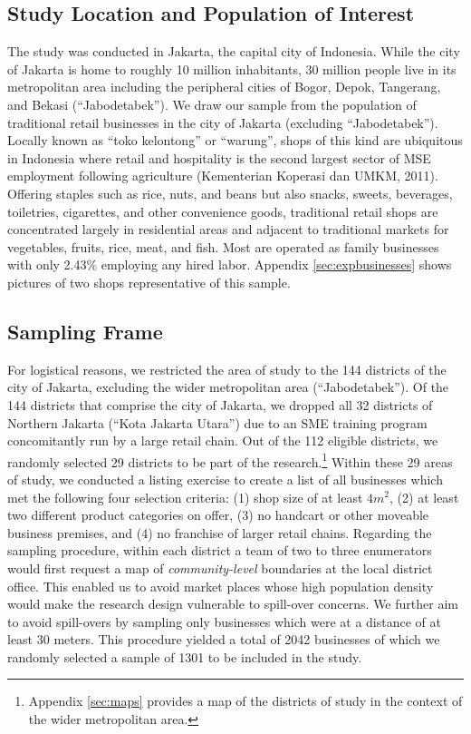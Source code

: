 \documentclass[11.5pt]{article}
\begin{document}
\subsection{Study Location and Population of Interest}

The study was conducted in Jakarta, the capital city of Indonesia. While the city of Jakarta is home to roughly 10 million inhabitants, 30 million people live in its metropolitan area including the peripheral cities of Bogor, Depok, Tangerang, and Bekasi (``Jabodetabek''). We draw our sample from the population of traditional retail businesses in the city of Jakarta (excluding ``Jabodetabek''). Locally known as ``toko kelontong'' or ``warung'', shops of this kind are ubiquitous in Indonesia where retail and hospitality is the second largest sector of MSE employment following agriculture (Kementerian Koperasi dan UMKM, 2011). Offering staples such as rice, nuts, and beans but also snacks, sweets, beverages, toiletries, cigarettes, and other convenience goods, traditional retail shops are concentrated largely in residential areas and adjacent to traditional markets for vegetables, fruits, rice, meat, and fish. Most are operated as family businesses with only 2.43\% employing any hired labor. Appendix \ref{sec:expbusinesses} shows pictures of two shops representative of this sample.


\subsection{Sampling Frame}

For logistical reasons, we restricted the area of study to the 144 districts of the city of Jakarta, excluding the wider metropolitan area (``Jabodetabek''). Of the 144 districts that comprise the city of Jakarta, we dropped all 32 districts of Northern Jakarta (``Kota Jakarta Utara'') due to an SME training program concomitantly run by a large retail chain. Out of the 112 eligible districts, we randomly selected 29 districts to be part of the research.\footnote{Appendix \ref{sec:maps} provides a map of the districts of study in the context of the wider metropolitan area.} Within these 29 areas of study, we conducted a listing exercise to create a list of all businesses which met the following four selection criteria: (1) shop size of at least $4m^2$, (2) at least two different product categories on offer, %
(3) no handcart or other moveable business premises, and (4) no franchise of larger retail chains. Regarding the sampling procedure, within each district a team of two to three enumerators would first request a map of \textit{community-level} boundaries at the local district office. This enabled us to avoid market places whose high population density would make the research design vulnerable to spill-over concerns. We further aim to avoid spill-overs by sampling only businesses which were at a distance of at least 30 meters. This procedure yielded a total of 2042 businesses of which we randomly selected a sample of 1301 to be included in the study.
\end{document}
